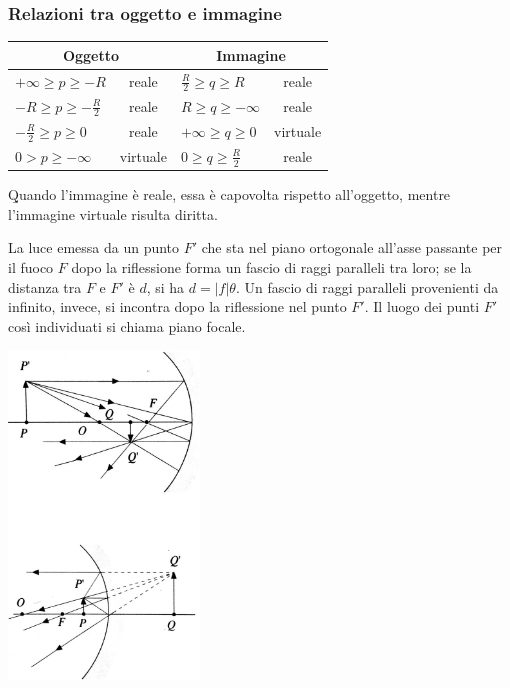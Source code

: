 \subsubsection{Relazioni tra oggetto e immagine}
\begin{center}
\begin{tabularx}{\textwidth}{Xc| Xc}
\toprule
\multicolumn{2}{c}{Oggetto} 			& \multicolumn{2}{c}{Immagine} 	\\
\midrule
$+\infty\ge p\ge-R$ 		& reale 		& $\frac{R}{2}\ge q\ge R$ 		& reale\\[2ex]
$-R\ge p\ge -\frac{R}{2}$ 	& reale 		& $R\ge q\ge -\infty$ 			& reale\\[2ex]
$-\frac{R}{2}\ge p\ge 0$ 	& reale 		& $+\infty\ge q \ge 0$ 			& virtuale\\[2ex]
$0> p\ge -\infty$ 		& virtuale 		& $0\ge q\ge \frac{R}{2}$ 		& reale\\[2ex]
\bottomrule
\end{tabularx}
\end{center}

\b{Quando l'immagine è reale, essa è capovolta rispetto all'oggetto, mentre l'immagine virtuale risulta diritta}.

La luce emessa da un punto $F'$ che sta nel piano ortogonale all'asse passante per il fuoco $F$ dopo la riflessione forma un fascio di raggi paralleli tra loro; se la distanza tra $F$ e $F'$ è $d$, si ha $d=|f|\theta$. Un fascio di raggi paralleli provenienti da infinito, invece, si incontra dopo la riflessione nel punto $F'$. Il luogo dei punti $F'$ così individuati si chiama \b{piano focale}.

\begin{center}
\includegraphics[width=2in]{immagini/specchi5.jpg}
\end{center}

